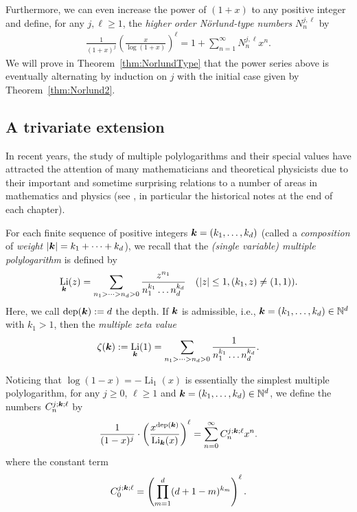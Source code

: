 \documentclass[11pt]{article}
\newcommand{\bfk}{{\boldsymbol{\sl{k}}}}
\DeclareMathOperator*{\dep}{dep}
\DeclareMathOperator{\Li}{Li}
\def\N{\mathbb{N}}
\theoremstyle{plain}
\theoremstyle{definition}
\begin{document}
Furthermore, we can even increase the power of $(1+x)$ to any positive integer and define, for any $j,\ell\ge 1$, the
\emph{higher order N\"orlund-type numbers} $N_n^{j,\ell}$ by
\begin{align}\label{defn-Norlund-type}
\frac{1}{(1+x)^j} \left(\frac{x}{\log(1+x)}\right)^\ell =1+\sum_{n=1}^\infty N_n^{j,\ell} x^n.
\end{align}
We will prove in Theorem~\ref{thm:NorlundType} that the power series above is eventually alternating by induction on $j$ with the initial case given by Theorem~\ref{thm:Norlund2}.


\subsection{A trivariate extension}
In recent years, the study of multiple polylogarithms and their special values have attracted the attention of many mathematicians and theoretical physicists due to their important and sometime surprising relations to a number of areas in mathematics and physics (see \cite{ZhaoBook}, in particular the historical notes at the end of each chapter).

For each finite sequence of positive integers $\bfk=(k_1,\dots,k_d)$ (called a \emph{composition} of \emph{weight} $|\bfk|=k_1+\dots+k_d$), we recall that the \emph{(single variable) multiple polylogarithm} is defined by
\begin{equation}\label{equ:Polylog}
\Li_\bfk(z) =\sum_{n_1>\dots>n_d>0} \frac{z^{n_1}}{n_1^{k_1}\dots n_d^{k_d}}    \quad(|z|\le 1, (k_1,z)\ne (1,1)).
\end{equation}
Here, we call $\dep(\bfk):=d$ the depth.
If $\bfk$ is admissible, i.e., $\bfk=(k_1,\dots,k_d)\in \N^d$ with $k_1>1$, then
the \emph{multiple zeta value}
\begin{equation*}
    \zeta(\bfk):=\Li_\bfk(1)=\sum_{n_1>\dots>n_d>0} \frac{1}{n_1^{k_1}\dots n_d^{k_d}} .
\end{equation*}


Noticing that $\log(1-x)=-\Li_1(x)$ is essentially the simplest multiple polylogarithm, for any $j\ge 0$, $\ell\ge 1$ and
$\bfk=(k_1,\dots,k_d)\in \N^d$, we define the numbers $C_{n}^{j;\bfk;\ell}$ by
\begin{equation}\label{equ:trivariateDefn}
 \frac{1}{(1-x)^j}\cdot \left(\frac{x^{\dep(\bfk)}}{\Li_\bfk(x)}\right)^\ell =\sum_{n=0}^\infty C_{n}^{j;\bfk;\ell}x^n.
\end{equation}
where the constant term
\begin{equation*}
C_{0}^{j;\bfk;\ell}=\left(\prod_{m=1}^d (d+1-m)^{k_m}\right)^\ell.
\end{equation*}
\end{document}

